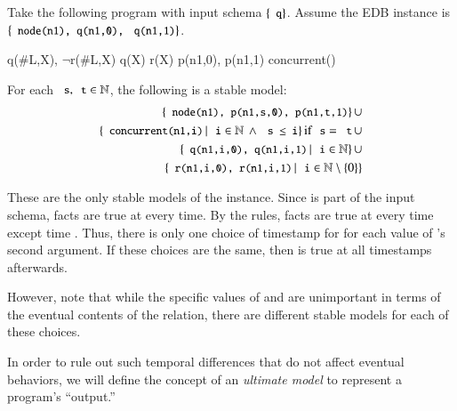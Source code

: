 \begin{example}
\label{ex:unimportant}
Take the following \lang program with input schema $\{\dedalus{q}\}$.  Assume the EDB instance is $\{\dedalus{node(n1), q(n1,0),}$ \linebreak $\dedalus{q(n1,1)}\}$.

\begin{Drules}
        {q(#L,X), $\lnot$r(#L,X)}
        {q(X)}
        {r(X)}
        {p(n1,0), p(n1,1)}
        {concurrent()}
\end{Drules}

For each $\dedalus{s}, \dedalus{t} \in \mathbb{N}$, the following is a stable model:
\begin{eqnarray*}
\{\dedalus{node(n1), p(n1,s,0), p(n1,t,1)}\} \, \cup \\
\{\dedalus{concurrent(n1,i)} \, | \, \dedalus{i} \in \mathbb{N} \, \land \, \dedalus{s $\leq$ i}\} \, \text{if} \, \dedalus{s} = \dedalus{t} \, \cup \\
\{\dedalus{q(n1,i,0), q(n1,i,1)} \, | \, \dedalus{i} \in \mathbb{N}\} \, \cup \\
\{\dedalus{r(n1,i,0), r(n1,i,1)} \, | \, \dedalus{i} \in \mathbb{N} \setminus \{0\}\}
\end{eqnarray*}

These are the only stable models of the instance. Since  is part of the input schema,  facts are true at every time.  By the rules,  facts are true at every time except time .  Thus, there is only one choice of timestamp for  for each value of 's second argument.  If these choices are the same, then  is true at all timestamps afterwards.

However, note that while the specific values of  and  are unimportant in terms of the eventual contents of the  relation, there are different stable models for each of these choices.
\end{example}

In order to rule out such temporal differences that do not affect eventual behaviors, we will define the concept of an {\em ultimate model} to represent a program's ``output.''


